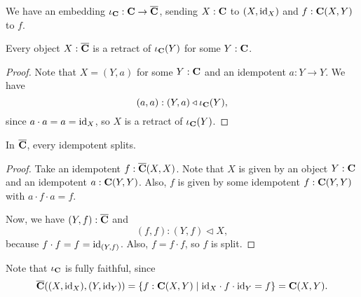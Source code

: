 \begin{definition}
  We have an embedding $ \iota_{\mathbf{C}}: \mathbf{C} \to \overline {\mathbf{C}} $, sending $ X: \mathbf{C} $ to $ (X, \text{id}_{X}) $ and $ f: \mathbf{C}(X, Y) $ to $ f $.
\end{definition}

\begin{lemma}\label{lem:karoubi-is-retract}
  Every object $ X: \overline {\mathbf{C}} $ is a retract of $ \iota_{\mathbf{C}}(Y) $ for some $ Y: \mathbf{C} $.
\end{lemma}
\begin{proof}
  Note that $ X = (Y, a) $ for some $ Y: \mathbf{C} $ and an idempotent $ a: Y \to Y $. We have
  \[ (a, a) : (Y, a) \triangleleft \iota_{\mathbf{C}}(Y), \]
  since $ a \cdot a = a = \text{id}_{X} $, so $ X $ is a retract of $ \iota_{\mathbf{C}}(Y) $.
\end{proof}

\begin{lemma}
  In $ \overline {\mathbf{C}} $, every idempotent splits.
\end{lemma}
\begin{proof}
  Take an idempotent $ f: \overline {\mathbf{C}}(X, X) $. Note that $ X $ is given by an object $ Y: \mathbf{C} $ and an idempotent $ a: \mathbf{C}(Y, Y) $. Also, $ f $ is given by some idempotent $ f: \mathbf{C}(Y, Y) $ with $ a \cdot f \cdot a = f $.

  Now, we have $ (Y, f): \overline {\mathbf{C}} $ and
  \[ (f, f) : (Y, f) \triangleleft X, \]
  because $ f \cdot f = f = \text{id}_{(Y, f)} $. Also, $ f = f \cdot f $, so $ f $ is split.
\end{proof}

\begin{remark}
  Note that $ \iota_{\mathbf{C}} $ is fully faithful, since
  \[ \overline {\mathbf{C}}((X, \text{id}_{X}), (Y, \text{id}_{Y})) = \{ f: \mathbf{C}(X, Y) \mid \text{id}_{X} \cdot f \cdot \text{id}_{Y} = f \} = \mathbf{C}(X, Y). \]
\end{remark}

